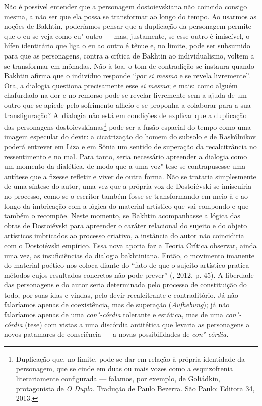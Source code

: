 Não é possível entender que a personagem dostoievskiana não coincida
consigo mesma, a não ser que ela possa se transformar ao longo do tempo.
Ao usarmos as noções de Bakhtin, poderíamos pensar que a duplicação da
personagem permite que o eu se veja como eu"-outro --- mas, justamente, se
esse outro é imiscível, o hífen identitário que liga o eu ao outro é
tênue e, no limite, pode ser subsumido para que as personagens, contra a
crítica de Bakhtin ao individualismo, voltem a se transformar em
mônadas. Não à toa, o tom de contradição se instaura quando Bakhtin
afirma que o indivíduo responde ``\emph{por si mesmo} e se revela
livremente''. Ora, a dialogia questiona precisamente esse \emph{si
mesmo}; e mais: como alguém chafurdado na dor e no remorso pode se
revelar livremente sem a ajuda de um outro que se apiede pelo sofrimento
alheio e se proponha a colaborar para a sua transfiguração? A~dialogia
não está em condições de explicar que a duplicação das personagens
dostoievskianas\footnote{Duplicação que, no limite, pode se dar em
  relação à própria identidade da personagem, que se cinde em duas ou
  mais vozes como a esquizofrenia literariamente configurada --- falamos,
  por exemplo, de Goliádkin, protagonista de \emph{O Duplo}. Tradução de
  Paulo Bezerra. São Paulo: Editora 34, 2013.} pode ser a fusão espacial
do tempo como uma imagem especular do devir: a cicatrização do homem do
subsolo e de Raskólnikov poderá entrever em Liza e em Sônia um sentido
de superação da recalcitrância no ressentimento e no mal. Para tanto,
seria necessário apreender a dialogia como um momento da dialética, de
modo que a uma voz"-tese se contrapusesse uma antítese que a fizesse
refletir e viver de outra forma. Não se trataria simplesmente de uma
síntese do autor, uma vez que a própria voz de Dostoiévski se imiscuiria
no processo, como se o escritor também fosse se transformando em meio à
e ao longo da imbricação com a lógica do material artístico que vai
compondo e que também o recompõe. Neste momento, se Bakhtin acompanhasse
a lógica das obras de Dostoiévski para apreender o caráter relacional do
sujeito e do objeto artísticos imbricados ao processo criativo, a
instância do autor não coincidiria com o Dostoiévski empírico. Essa nova
aporia faz a Teoria Crítica observar, ainda uma vez, as insuficiências
da dialogia bakhtiniana. Então, o movimento imanente do material poético
nos coloca diante do ``fato de que o sujeito artístico pratica métodos
cujos resultados concretos não pode prever'' (, 2012, p. 45). A
liberdade das personagens e do autor seria determinada pelo processo de
constituição do todo, por suas idas e vindas, pelo devir recalcitrante e
contraditório. Já não falaríamos apenas de coexistência, mas de
superação (\emph{Aufhebung}); já não falaríamos apenas de uma
\emph{con"-córdia} tolerante e estática, mas de uma \emph{con"-córdia}
(tese) com vistas a uma discórdia antitética que levaria as personagens
a novos patamares de consciência --- a novas possibilidades de
\emph{con"-córdia.}


